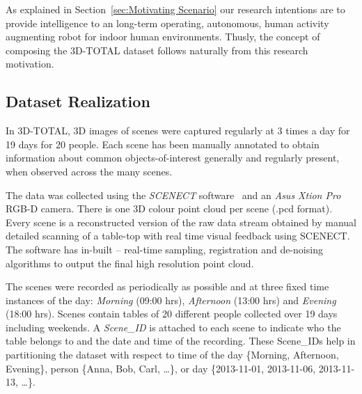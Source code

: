 \documentclass[letterpaper, 10 pt, conference]{ieeeconf}  %
\begin{document}
As explained in Section~\ref{sec:Motivating Scenario} our research intentions are to provide intelligence to an long-term operating, autonomous, human activity augmenting robot for indoor human environments. Thusly, the concept of composing the 3D-TOTAL dataset follows naturally from this research motivation.

\subsection{Dataset Realization}
\label{ssec:Dataset Realization}
In 3D-TOTAL, 3D images of scenes were captured regularly at 3 times a day for 19 days for 20 people. Each scene has been manually annotated to obtain information about common objects-of-interest generally and regularly present, when observed across the many scenes.

The data was collected using the \textit{SCENECT} software~\cite{Buerkler:Online2012} and an \textit{Asus Xtion Pro} RGB-D camera. There is one 3D colour point cloud per scene (.pcd format). Every scene is a reconstructed version of the raw data stream obtained by manual detailed scanning of a table-top with real time visual feedback using SCENECT. The software has in-built -- real-time sampling, registration and de-noising algorithms to output the final high resolution point cloud.

The scenes were recorded as periodically as possible and at three fixed time instances of the day: \emph{Morning} (09:00 hrs), \emph{Afternoon} (13:00 hrs) and \emph{Evening} (18:00 hrs). Scenes contain tables of 20 different people collected over 19 days including weekends. A \textit{Scene\_ID} is attached to each scene to indicate who the table belongs to and the date and time of the recording. These Scene\_IDs help in partitioning the dataset with respect to time of the day \{Morning, Afternoon, Evening\}, person \{Anna, Bob, Carl, \dots\}, or day \{2013-11-01, 2013-11-06, 2013-11-13, \dots\}.
\end{document}
